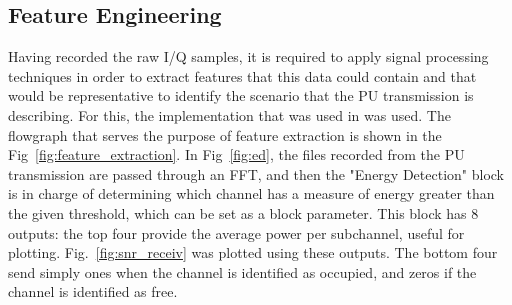 \subsection{Feature Engineering}\label{ch:features}
Having recorded the raw I/Q samples, it is required to apply signal processing techniques in order to extract features that this data could contain and that would be representative to identify the scenario that the \ac{PU} transmission is describing. For this, the implementation that was used in \cite{Wunsch2017} was used. The flowgraph that serves the purpose of feature extraction is shown in the Fig~\ref{fig:feature_extraction}. In Fig~\ref{fig:ed}, the files recorded from the \ac{PU} transmission are passed through an \ac{FFT}, and then the "Energy Detection" block is in charge of determining which channel has a measure of energy greater than the given threshold, which can be set as a block parameter. This block has 8 outputs: the top four provide the average power per subchannel, useful for plotting. Fig.~\ref{fig:snr_receiv} was plotted using these outputs. The bottom four send simply ones when the channel is identified as occupied, and zeros if the channel is identified as free.

